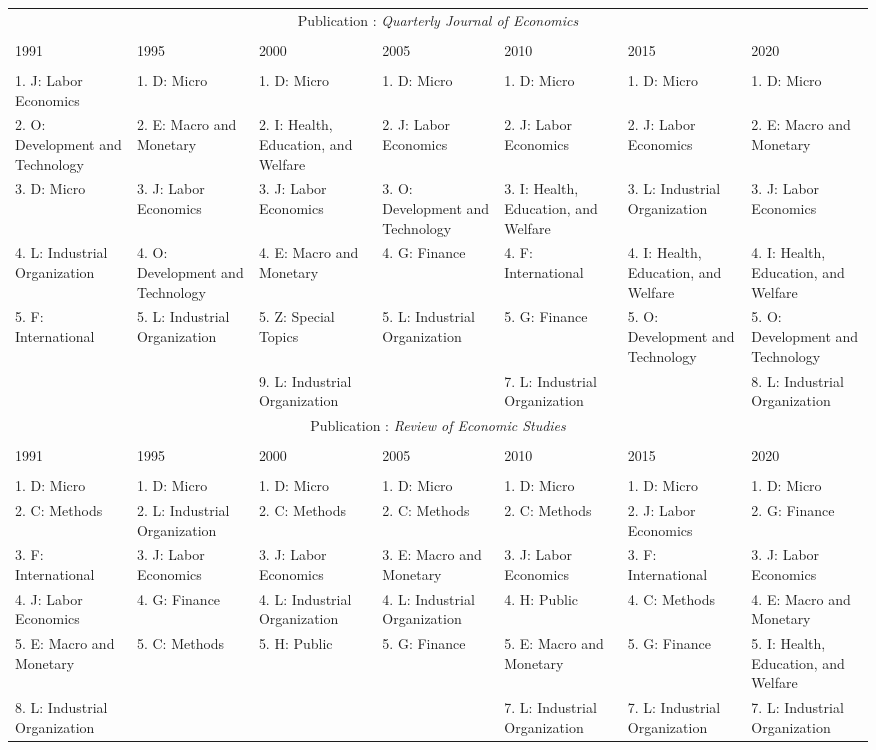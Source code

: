 \begin{table}[h]
\begin{adjustbox}{max width = \textwidth}
\begin{tabular}{@{\extracolsep{5pt}} lllllll}
 \multicolumn{7}{c}{Publication : \textit{Quarterly Journal of Economics}} \\
 \cline{1-7} \\
1991 & 1995 & 2000 & 2005 & 2010 & 2015 & 2020 \\ 
\hline \\[-1.8ex] 
1. J: Labor Economics & 1. D: Micro & 1. D: Micro & 1. D: Micro & 1. D: Micro & 1. D: Micro & 1. D: Micro \\ 
2. O: Development and Technology & 2. E: Macro and Monetary & 2. I: Health, Education, and Welfare & 2. J: Labor Economics & 2. J: Labor Economics & 2. J: Labor Economics & 2. E: Macro and Monetary \\ 
3. D: Micro & 3. J: Labor Economics & 3. J: Labor Economics & 3. O: Development and Technology & 3. I: Health, Education, and Welfare & 3. L: Industrial Organization & 3. J: Labor Economics \\ 
4. L: Industrial Organization & 4. O: Development and Technology & 4. E: Macro and Monetary & 4. G: Finance & 4. F: International & 4. I: Health, Education, and Welfare & 4. I: Health, Education, and Welfare \\ 
5. F: International & 5. L: Industrial Organization & 5. Z: Special Topics & 5. L: Industrial Organization & 5. G: Finance & 5. O: Development and Technology & 5. O: Development and Technology \\ 
 &  & 9. L: Industrial Organization &  & 7. L: Industrial Organization &  & 8. L: Industrial Organization \\ 

 \multicolumn{7}{c}{Publication : \textit{Review of Economic Studies}} \\
 \cline{1-7} \\
1991 & 1995 & 2000 & 2005 & 2010 & 2015 & 2020 \\ 
\hline \\[-1.8ex] 
1. D: Micro & 1. D: Micro & 1. D: Micro & 1. D: Micro & 1. D: Micro & 1. D: Micro & 1. D: Micro \\ 
2. C: Methods & 2. L: Industrial Organization & 2. C: Methods & 2. C: Methods & 2. C: Methods & 2. J: Labor Economics & 2. G: Finance \\ 
3. F: International & 3. J: Labor Economics & 3. J: Labor Economics & 3. E: Macro and Monetary & 3. J: Labor Economics & 3. F: International & 3. J: Labor Economics \\ 
4. J: Labor Economics & 4. G: Finance & 4. L: Industrial Organization & 4. L: Industrial Organization & 4. H: Public & 4. C: Methods & 4. E: Macro and Monetary \\ 
5. E: Macro and Monetary & 5. C: Methods & 5. H: Public & 5. G: Finance & 5. E: Macro and Monetary & 5. G: Finance & 5. I: Health, Education, and Welfare \\ 
8. L: Industrial Organization &  &  &  & 7. L: Industrial Organization & 7. L: Industrial Organization & 7. L: Industrial Organization \\ 
\hline 
\end{tabular} 
\end{adjustbox} 
\end{table} 
